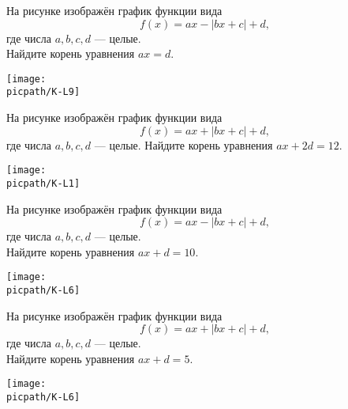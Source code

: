 \begin{homework}[number=1]
	\begin{listofex}
		\item
		\begin{minipage}[t]{\bodywidth}
			На рисунке изображён график функции вида \[ f(x)=ax-|bx+c|+d, \] где числа \(a, b, c, d\) --- целые.\\ Найдите корень уравнения \(ax=d\).
		\end{minipage}
		\hspace{0.02\linewidth}
		\begin{minipage}[t]{\picwidth}
			\texttt{[image: \\picpath/K-L9]}
		\end{minipage}
		\item
		\begin{minipage}[t]{\bodywidth}
			На рисунке изображён график функции вида \[ f(x)=ax+|bx+c|+d, \] где числа \(a, b, c, d\) --- целые. Найдите корень уравнения \(ax+2d=12\).
		\end{minipage}
		\hspace{0.02\linewidth}
		\begin{minipage}[t]{\picwidth}
			\texttt{[image: \\picpath/K-L1]}
		\end{minipage}
		\item
		\begin{minipage}[t]{\bodywidth}
			На рисунке изображён график функции вида \[ f(x)=ax-|bx+c|+d, \] где числа \(a, b, c, d\) --- целые.\\ Найдите корень уравнения \(ax+d=10\).
		\end{minipage}
		\hspace{0.02\linewidth}
		\begin{minipage}[t]{\picwidth}
			\texttt{[image: \\picpath/K-L6]}
		\end{minipage}
		\item
		\begin{minipage}[t]{\bodywidth}
			На рисунке изображён график функции вида \[ f(x)=ax+|bx+c|+d, \] где числа \(a, b, c, d\) --- целые.\\ Найдите корень уравнения \(ax+d=5\).
		\end{minipage}
		\hspace{0.02\linewidth}
		\begin{minipage}[t]{\picwidth}
			\texttt{[image: \\picpath/K-L6]}
		\end{minipage}

\end{listofex}
\end{homework}
